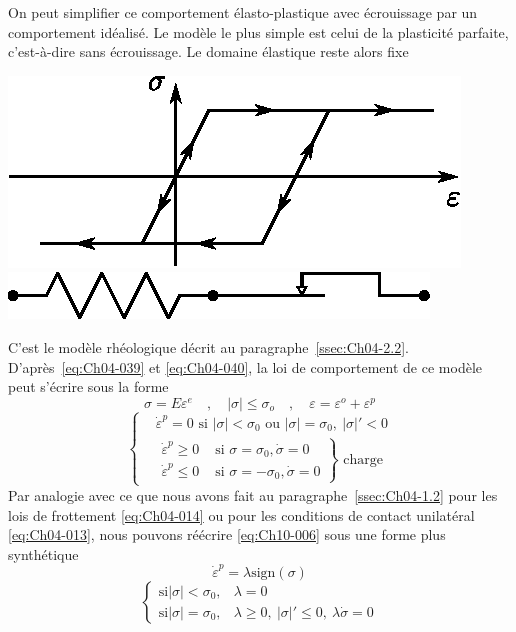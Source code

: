 On peut simplifier ce comportement élasto-plastique avec écrouissage par un 	comportement idéalisé.
Le modèle le plus simple est celui de la plasticité parfaite, c'est-à-dire sans écrouissage.
Le domaine élastique reste alors fixe
\begin{center}
    \includegraphics{../images/T1_Ch10-03.eps}
    \includegraphics{../images/T1_Ch10-04.eps}
\end{center}
C'est le modèle rhéologique décrit au paragraphe~\ref{ssec:Ch04-2.2}.
D'après~\eqref{eq:Ch04-039} et \eqref{eq:Ch04-040}, la loi de comportement de ce modèle peut s'écrire sous la forme 
\begin{equation}
    \sigma = E \varepsilon^e \quad, \quad |\sigma| \leq \sigma_o \quad, \quad \varepsilon = \varepsilon^o + \varepsilon^p 
    \label{eq:Ch10-005}
\end{equation}
\begin{equation}
    \left\{
    \begin{aligned}
        &\dot{\varepsilon}^p = 0  \text{ si } |\sigma| < \sigma_0 \text{ ou } |\sigma| = \sigma_0, \ |\sigma|' < 0 \\
        &\left.
        \begin{aligned}
            \dot{\varepsilon}^p \geq 0 & \text{ si } \sigma = \sigma_0, \dot{\sigma} = 0 \\
            \dot{\varepsilon}^p \leq 0 & \text{ si } \sigma = - \sigma_0, \dot{\sigma} = 0
        \end{aligned}
        \right\} \text{ charge}
    \end{aligned}
    \right.
    \label{eq:Ch10-006}
\end{equation}
Par analogie avec ce que nous avons fait au paragraphe~\ref{ssec:Ch04-1.2} pour les lois de frottement \eqref{eq:Ch04-014} ou pour les conditions de contact unilatéral \eqref{eq:Ch04-013}, nous pouvons réécrire \eqref{eq:Ch10-006} sous une forme plus synthétique 
\begin{equation}
    \dot{\varepsilon}^p = \lambda \text{sign} (\sigma)
    \label{eq:Ch10-007}
\end{equation}
\begin{equation}
    \left\{
    \begin{aligned}
        \text{si} |\sigma| < \sigma_0, & \lambda = 0 \\
        \text{si} |\sigma| = \sigma_0, & \lambda \geq 0, \ |\sigma|' \leq 0, \ \lambda \dot{\sigma} = 0
    \end{aligned}
    \right.
    \label{eq:Ch10-008}
\end{equation}

